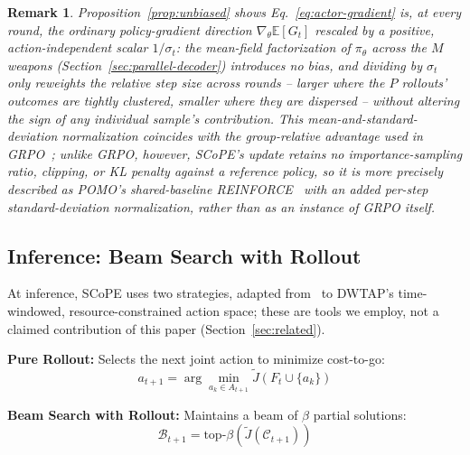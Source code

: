 \documentclass[smallcondensed]{svjour3}
\newtheorem{remark}{Remark}
\begin{document}
\begin{remark}
Proposition~\ref{prop:unbiased} shows Eq.~\eqref{eq:actor-gradient} is, at every round, the ordinary policy-gradient direction $\nabla_\theta\mathbb{E}[G_t]$ rescaled by a positive, action-independent scalar $1/\sigma_t$: the mean-field factorization of $\pi_\theta$ across the $M$ weapons (Section~\ref{sec:parallel-decoder}) introduces no bias, and dividing by $\sigma_t$ only reweights the relative step size across rounds -- larger where the $P$ rollouts' outcomes are tightly clustered, smaller where they are dispersed -- without altering the sign of any individual sample's contribution. This mean-and-standard-deviation normalization coincides with the group-relative advantage used in GRPO~\cite{shao2024deepseekmath}; unlike GRPO, however, SCoPE's update retains no importance-sampling ratio, clipping, or KL penalty against a reference policy, so it is more precisely described as POMO's shared-baseline REINFORCE~\cite{kwon2020pomo} with an added per-step standard-deviation normalization, rather than as an instance of GRPO itself.
\end{remark}


\subsection{Inference: Beam Search with Rollout}

At inference, SCoPE uses two strategies, adapted from~\cite{bertsekas1997rollout,choo2022sgbs} to DWTAP's time-windowed, resource-constrained action space; these are tools we employ, not a claimed contribution of this paper (Section~\ref{sec:related}).

\textbf{Pure Rollout:} Selects the next joint action to minimize cost-to-go:
\begin{equation}
    a_{t+1} = \arg\min_{a_k \in A_{t+1}} \widetilde{J}(F_t \cup \{a_k\})
\end{equation}

\textbf{Beam Search with Rollout:} Maintains a beam of $\beta$ partial solutions:
\begin{equation}
    \mathcal{B}_{t+1} = \text{top-}\beta(\widetilde{J}(\mathcal{C}_{t+1}))
\end{equation}
\end{document}
